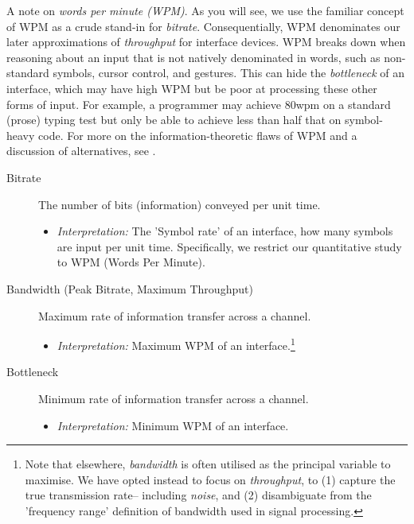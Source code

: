 \documentclass[logo,bsc,singlespacing,parskip]{infthesis}
\begin{document}
A note on \emph{words per minute (WPM)}.
As you will see, we use the familiar concept of WPM as a crude stand-in for \emph{bitrate}.
Consequentially, WPM denominates our later approximations of \emph{throughput} for interface devices.
WPM breaks down when reasoning about an input that is not natively denominated in words, such as non-standard symbols, cursor control, and gestures.
This can hide the \emph{bottleneck} of an interface, which may have high WPM but be poor at processing these other forms of input.
For example, a programmer may achieve 80wpm on a standard (prose) typing test but only be able to achieve less than half that on symbol-heavy code.
For more on the information-theoretic flaws of WPM and a discussion of alternatives, see \autocite[pp. 57]{liuInformationTheoryUnified}.

{ %
\begin{mdframed}
\begin{description}
\item[{Bitrate\label{bitrate}}] The number of bits (information) conveyed per unit time.
\begin{itemize}
\item \emph{Interpretation:} The 'Symbol rate' of an interface, how many symbols are input per unit time. 
Specifically, we restrict our quantitative study to WPM (Words Per Minute).
\end{itemize}
\end{description}
\end{mdframed}

\begin{mdframed}
\begin{description}
\item[{Bandwidth\label{bandwidth} (Peak Bitrate, Maximum Throughput)}] Maximum rate of information transfer across a channel.
\begin{itemize}
\item \emph{Interpretation:} Maximum WPM of an interface.\footnote{Note that elsewhere, \emph{bandwidth} is often utilised as the principal variable to maximise. We have opted instead to focus on \emph{throughput}, to (1) capture the true transmission rate-- including \emph{noise}, and (2) disambiguate from the 'frequency range' definition of bandwidth used in signal processing.}
\end{itemize}
\end{description}
\end{mdframed}

\begin{mdframed}
\begin{description}
\item[{Bottleneck\label{bottleneck}}] Minimum rate of information transfer across a channel.
\begin{itemize}
\item \emph{Interpretation:} Minimum WPM of an interface.
\end{itemize}
\end{description}
\end{mdframed}

}
\end{document}
